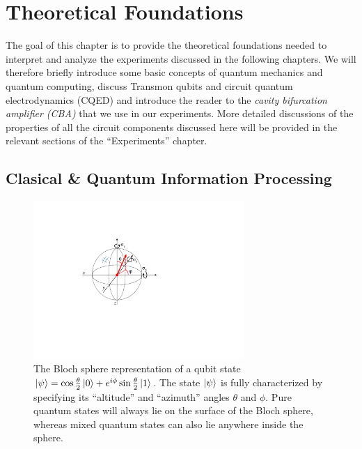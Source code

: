\chapter{Theoretical Foundations}

The goal of this chapter is to provide the theoretical foundations needed to interpret and analyze the experiments discussed in the following chapters. We will therefore briefly introduce some basic concepts of quantum mechanics and quantum computing, discuss Transmon qubits and circuit quantum electrodynamics (CQED) and introduce the reader to the {\it cavity bifurcation amplifier (CBA)} that we use in our experiments. More detailed discussions of the properties of all the circuit components discussed here will be provided in the relevant sections of the ``Experiments'' chapter.

\section{Clasical \& Quantum Information Processing}

\begin{figure}
	\includegraphics[width=8cm]{"./material/figures/introduction/bloch_sphere"}
	\caption{The Bloch sphere representation of a qubit state $\left| \psi \right> = \cos{\frac{\theta}{2}}\left| 0 \right>+e^{i\phi}\sin{\frac{\theta}{2}}\left| 1 \right>$. The state $\left| \psi \right>$ is fully characterized by specifying its ``altitude'' and ``azimuth'' angles $\theta$ and $\phi$. Pure quantum states will always lie on the surface of the Bloch sphere, whereas mixed quantum states can also lie anywhere inside the sphere.}
	\label{fig:BlochSphere}
\end{figure}


